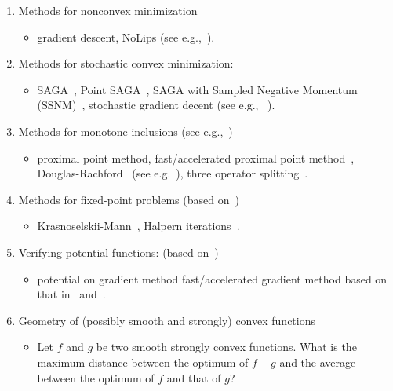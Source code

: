 \documentclass[11pt,a4paper]{article}
\begin{document}
\begin{enumerate}
\begin{itemize}
	\end{itemize}
	\item Methods for nonconvex minimization
	\begin{itemize}
		\item gradient descent, NoLips (see e.g.,~\cite{bolte2018first}).
	\end{itemize}
	\item Methods for stochastic convex minimization:
	\begin{itemize}
		\item SAGA~\cite{defazio2014saga}, Point SAGA~\cite{defazio2016simple}, SAGA with Sampled Negative Momentum (SSNM)~\cite{pmlr-v89-zhou19c}, stochastic gradient decent (see e.g.,~ \cite{moulines2011non}).
	\end{itemize}
	\item Methods for monotone inclusions (see e.g.,~\cite{bauschke2011convex,ryu2016primer})
	\begin{itemize}
		\item proximal point method, fast/accelerated proximal point method~\cite{kim2019accelerated}, Douglas-Rachford~\cite{douglas1956,moursi2019douglas} (see e.g.~\cite{bauschke2017douglas}), three operator splitting~\cite{davis2017three}.
	\end{itemize}
	\item Methods for fixed-point problems (based on~\cite{lieder2017convergence,lieder2018})
	\begin{itemize}
		\item Krasnoselskii-Mann~\cite{mann1953mean}, Halpern iterations~\cite{halpern1967fixed}.
	\end{itemize}
	\item Verifying potential functions: (based on~\cite{pmlr-v99-taylor19a})
	\begin{itemize}
		\item potential on gradient method fast/accelerated gradient method based on that in~\cite{bansal2017potential} and~\cite{pmlr-v99-taylor19a}.
	\end{itemize}
	\item Geometry of (possibly smooth and strongly) convex functions
	\begin{itemize}
		\item Let $f$ and $g$ be two smooth strongly convex functions. What is the maximum distance between the optimum of $f+g$ and the average between the optimum of $f$ and that of $g$?
	\end{itemize}
\end{enumerate}
\end{document}
